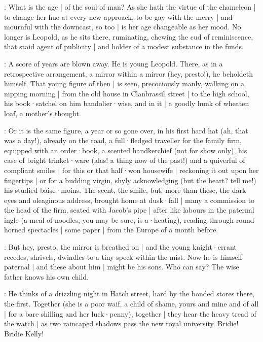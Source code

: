 

:
What is the age |
of the soul of man?
As she hath the virtue of the chameleon |
to change her hue at every new approach,
to be gay with the merry |
and mournful with the downcast,
so too |
is her age changeable as her mood.
No longer is Leopold,
as he sits there,
ruminating,
chewing the cud of reminiscence,
that staid agent of publicity |
and holder of a modest substance in the funds.

:
A score of years are blown away.
He is young Leopold.
There,
as in a retrospective arrangement,
a mirror within a mirror
(hey, presto!),
he beholdeth himself.
That young figure of then |
is seen,
precociously manly,
walking on a nipping morning |
from the old house in Clanbrassil street |
to the high school,
his book·satchel on him bandolier·wise,
and in it |
a goodly hunk of wheaten loaf,
a mother's thought.

:
Or it is the same figure,
a year or so gone over,
in his first hard hat
(ah, that was a day!),
already on the road,
a full·fledged traveller for the family firm,
equipped with an order·book,
a scented handkerchief
(not for show only),
his case of bright trinket·ware
(alas!
a thing now of the past!)
and a quiverful of compliant smiles |
for this or that half·won housewife |
reckoning it out upon her fingertips |
or for a budding virgin,
shyly acknowledging
(but the heart?
tell me!)
his studied baise·moins.
The scent,
the smile,
but,
more than these,
the dark eyes and oleaginous address,
brought home at dusk·fall |
many a commission to the head of the firm,
seated with Jacob's pipe |
after like labours in the paternal ingle
(a meal of noodles,
you may be sure,
is a·heating),
reading through round horned spectacles |
some paper |
from the Europe of a month before.

:
But hey,
presto,
the mirror is breathed on |
and the young knight·errant recedes,
shrivels,
dwindles to a tiny speck within the mist.
Now he is himself paternal |
and these about him |
might be his sons.
Who can say?
The wise father knows his own child.

:
He thinks of a drizzling night in Hatch street,
hard by the bonded stores there,
the first.
Together
(she is a poor waif,
a child of shame,
yours and mine and of all |
for a bare shilling and her luck·penny),
together |
they hear the heavy tread of the watch |
as two raincaped shadows pass the new royal university.
Bridie!
Bridie Kelly!


